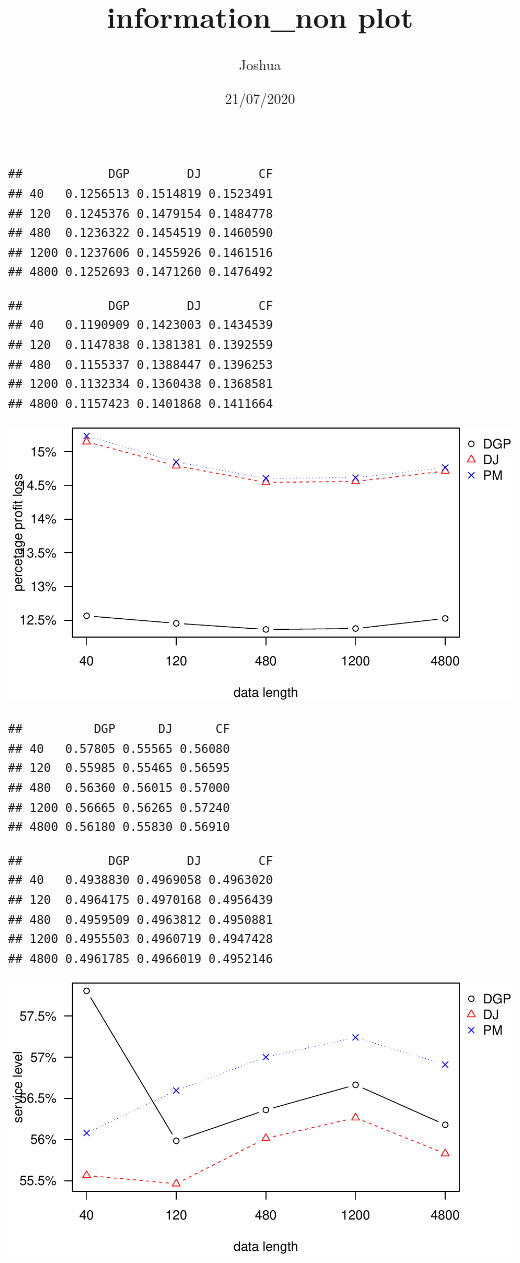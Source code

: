 \documentclass[
]{article}
\title{information\_non plot}
\author{Joshua}
\date{21/07/2020}
\begin{document}
\maketitle

\begin{verbatim}
##            DGP        DJ        CF
## 40   0.1256513 0.1514819 0.1523491
## 120  0.1245376 0.1479154 0.1484778
## 480  0.1236322 0.1454519 0.1460590
## 1200 0.1237606 0.1455926 0.1461516
## 4800 0.1252693 0.1471260 0.1476492
\end{verbatim}

\begin{verbatim}
##            DGP        DJ        CF
## 40   0.1190909 0.1423003 0.1434539
## 120  0.1147838 0.1381381 0.1392559
## 480  0.1155337 0.1388447 0.1396253
## 1200 0.1132334 0.1360438 0.1368581
## 4800 0.1157423 0.1401868 0.1411664
\end{verbatim}

\includegraphics{information_non-plot_files/figure-latex/AR(1)ppl-1.pdf}

\begin{verbatim}
##          DGP      DJ      CF
## 40   0.57805 0.55565 0.56080
## 120  0.55985 0.55465 0.56595
## 480  0.56360 0.56015 0.57000
## 1200 0.56665 0.56265 0.57240
## 4800 0.56180 0.55830 0.56910
\end{verbatim}

\begin{verbatim}
##            DGP        DJ        CF
## 40   0.4938830 0.4969058 0.4963020
## 120  0.4964175 0.4970168 0.4956439
## 480  0.4959509 0.4963812 0.4950881
## 1200 0.4955503 0.4960719 0.4947428
## 4800 0.4961785 0.4966019 0.4952146
\end{verbatim}

\includegraphics{information_non-plot_files/figure-latex/AR(1)sl-1.pdf}
\end{document}
